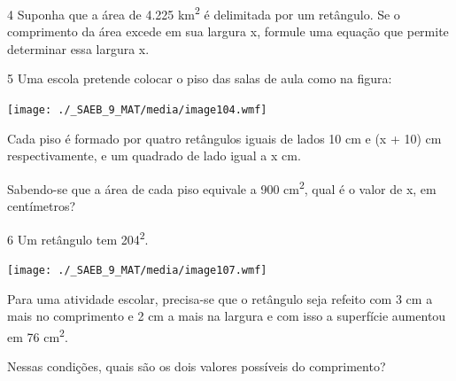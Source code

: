\begin{escolha}
{{{\begin{escolha}
{

\num{4} Suponha que a área de 4.225 km\textsuperscript{2} é delimitada por um
retângulo. Se o comprimento da área excede em sua largura x, formule uma 
equação que permite determinar essa largura x.


\num{5} Uma escola pretende colocar o piso das salas de aula como na
figura:

\texttt{[image: ./\_SAEB\_9\_MAT/media/image104.wmf]}

Cada piso é formado por quatro retângulos iguais de lados 10 cm e (x +
10) cm respectivamente, e um quadrado de lado igual a x cm.

Sabendo-se que a área de cada piso equivale a 900 cm\textsuperscript{2},
qual é o valor de x, em centímetros?


\num{6} Um retângulo tem 204\textsuperscript{2}.

\texttt{[image: ./\_SAEB\_9\_MAT/media/image107.wmf]}

Para uma atividade escolar, precisa-se que o retângulo seja refeito com 3
cm a mais no comprimento e 2 cm a mais na largura e com isso a
superfície aumentou em 76 cm\textsuperscript{2}.

Nessas condições, quais são os dois valores possíveis do comprimento?


}
\end{escolha}}}}
\end{escolha}

